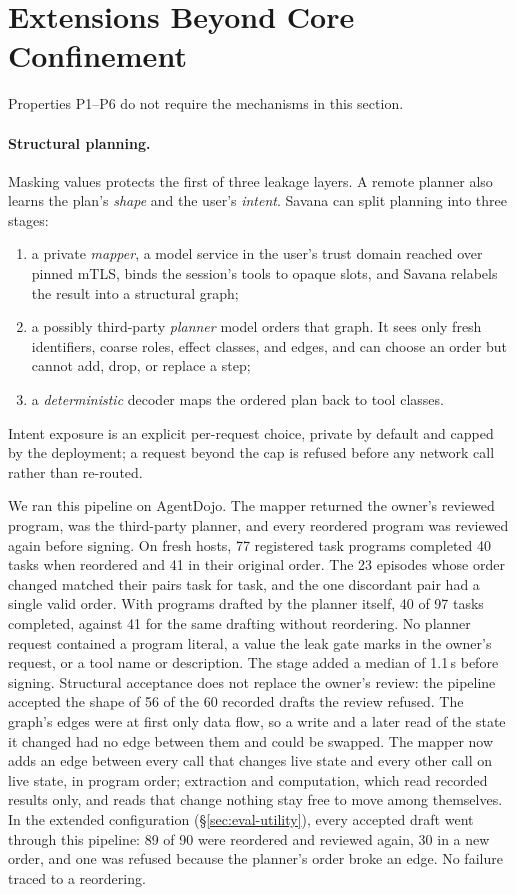 \documentclass[letterpaper,twocolumn,10pt]{article}
\newcommand{\sys}{Savana}
\newcommand{\code}[1]{\texttt{\detokenize{#1}}}
\begin{document}
\section{Extensions Beyond Core Confinement}
\label{sec:beyond}

Properties P1--P6 do not require the mechanisms in this section.

\paragraph{Structural planning.} Masking values protects the first of
three leakage layers. A remote planner also learns the plan's
\emph{shape} and the user's \emph{intent}. \sys{} can split planning into
three stages:
\begin{enumerate}
\item a private \emph{mapper}, a model service in the user's trust domain
  reached over pinned mTLS, binds the session's tools to opaque slots,
  and \sys{} relabels the result into a structural graph;
\item a possibly third-party \emph{planner} model orders that graph. It
  sees only fresh identifiers, coarse roles, effect classes, and edges,
  and can choose an order but cannot add, drop, or replace a step;
\item a \emph{deterministic} decoder maps the ordered plan back to tool
  classes.
\end{enumerate}
Intent exposure is an explicit per-request choice, private by default
and capped by the deployment; a request beyond the cap is refused before
any network call rather than re-routed.

We ran this pipeline on AgentDojo. The mapper returned the owner's
reviewed program, \code{deepseek-flash} was the third-party planner, and
every reordered program was reviewed again before signing. On fresh hosts,
77 registered task programs completed 40 tasks when reordered and 41 in
their original order. The 23 episodes whose order changed matched their
pairs task for task, and the one discordant pair had a single valid order.
With programs drafted by the planner itself, 40 of 97 tasks completed,
against 41 for the same drafting without reordering. No planner request
contained a program literal, a value the leak gate marks in the owner's
request, or a tool name or description. The stage added a median of
1.1\,s before signing. Structural acceptance
does not replace the owner's review: the pipeline accepted the shape of
56 of the 60 recorded drafts the review refused.
The graph's edges were at first only data flow, so a write and a later
read of the state it changed had no edge between them and could be
swapped. The mapper now adds an edge between every call that changes live
state and every other call on live state, in program order; extraction and
computation, which read recorded results only, and reads that change
nothing stay free to move among themselves.
In the extended configuration (\S\ref{sec:eval-utility}), every accepted
draft went through this pipeline: 89 of 90 were reordered and reviewed
again, 30 in a new order, and one was refused because the planner's order
broke an edge. No failure traced to a reordering.
\end{document}
